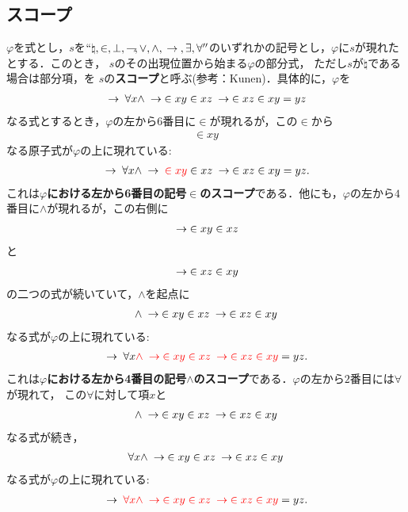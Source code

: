 \subsection{スコープ}
	$\varphi$を式とし，$s$を$``\natural,\in,\bot,\rightharpoondown\hspace{-0.25em},\vee,\wedge,
	\hspace{0.25em}\rightarrow\hspace{0.25em},\exists,\forall''$のいずれかの記号とし，$\varphi$に$s$が現れたとする．このとき，
	$s$のその出現位置から始まる$\varphi$の部分式，
	ただし$s$が$\natural$である場合は部分項，を
	$s$の{\bf スコープ}と呼ぶ(参考：Kunen\cite{Kunen})．具体的に，$\varphi$を
	\begin{align}
		\hspace{0.25em}\rightarrow\hspace{0.25em} \forall x \wedge \hspace{0.25em}\rightarrow\hspace{0.25em} \in xy \in xz \hspace{0.25em}\rightarrow\hspace{0.25em} \in xz \in xy = yz
	\end{align}
	なる式とするとき，$\varphi$の左から$6$番目に$\in$が現れるが，この$\in$から
	\begin{align}
		\in xy
	\end{align}
	なる原子式が$\varphi$の上に現れている:
	\begin{align}
		\hspace{0.25em}\rightarrow\hspace{0.25em} \forall x \wedge \hspace{0.25em}\rightarrow\hspace{0.25em} \textcolor{red}{\in xy} \in xz \hspace{0.25em}\rightarrow\hspace{0.25em} \in xz \in xy = yz.
	\end{align}
	これは{\bf $\varphi$における左から6番目の記号$\in$のスコープ}である．他にも，$\varphi$の左から$4$番目に$\wedge$が現れるが，この右側に
	\begin{align}
		\hspace{0.25em}\rightarrow\hspace{0.25em} \in xy \in xz
	\end{align}
	と
	\begin{align}
		\hspace{0.25em}\rightarrow\hspace{0.25em} \in xz \in xy
	\end{align}
	の二つの式が続いていて，$\wedge$を起点に
	\begin{align}
		\wedge \hspace{0.25em}\rightarrow\hspace{0.25em} \in xy \in xz \hspace{0.25em}\rightarrow\hspace{0.25em} \in xz \in xy
	\end{align}
	なる式が$\varphi$の上に現れている:
	\begin{align}
		\hspace{0.25em}\rightarrow\hspace{0.25em} \forall x \textcolor{red}{\wedge \hspace{0.25em}\rightarrow\hspace{0.25em} \in xy \in xz \hspace{0.25em}\rightarrow\hspace{0.25em} \in xz \in xy} = yz.
	\end{align}
	これは{\bf $\varphi$における左から4番目の記号$\wedge$のスコープ}である．$\varphi$の左から$2$番目には$\forall$が現れて，
	この$\forall$に対して項$x$と
	\begin{align}
		\wedge \hspace{0.25em}\rightarrow\hspace{0.25em} \in xy \in xz \hspace{0.25em}\rightarrow\hspace{0.25em} \in xz \in xy
	\end{align}
	なる式が続き，
	\begin{align}
		\forall x \wedge \hspace{0.25em}\rightarrow\hspace{0.25em} \in xy \in xz \hspace{0.25em}\rightarrow\hspace{0.25em} \in xz \in xy
	\end{align}
	なる式が$\varphi$の上に現れている:
	\begin{align}
		\hspace{0.25em}\rightarrow\hspace{0.25em} \textcolor{red}{\forall x \wedge \hspace{0.25em}\rightarrow\hspace{0.25em} \in xy \in xz \hspace{0.25em}\rightarrow\hspace{0.25em} \in xz \in xy} = yz.
	\end{align}
	
